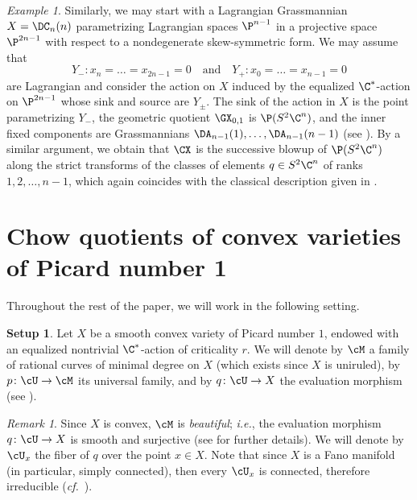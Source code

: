 \documentclass[11pt]{amsart}
\numberwithin{equation}{section}
\theoremstyle{definition}
\newtheorem{setup}[theorem]{Setup}
\theoremstyle{remark}
\newtheorem{remark}[theorem]{Remark}
\newtheorem{example}[theorem]{Example}
\begin{document}
\begin{example}\label{ex:classicex3}
  Similarly, we may start with a Lagrangian Grassmannian $X=\DC_n(n)$ parametrizing Lagrangian spaces $\P^{n-1}$ in a projective space $\P^{2n-1}$ with respect to a nondegenerate skew-symmetric form. We may assume that
  \[
  Y_-:x_n=\dots=x_{2n-1}=0\quad\mbox{and}\quad Y_+:x_0=\dots=x_{n-1}=0 
  \]
  are Lagrangian and consider the action on $X$ induced by the equalized $\C^*$-action on $\P^{2n-1}$ whose sink and source are $Y_\pm$. The sink of the action in $X$ is the point parametrizing $Y_-$, the geometric quotient $\GX_{0,1}$ is $\P(S^2\C^n)$, and the inner fixed components are Grassmannians $\DA_{n-1}(1),\dots,\DA_{n-1}(n-1)$ (see \cite{FS}). By a similar argument, we obtain that $\CX$ is the successive blowup of $\P(S^2\C^n)$ along the strict transforms of the classes of elements $q\in S^2\C^n$ of ranks $1,2,\dots, n-1$, which again coincides with the classical description given in \cite{Vai82}. 
\end{example}


\section{Chow quotients of convex varieties of Picard number 1}\label{sec:boundaryprimal}

Throughout the rest of the paper, we will work in the following setting. 

\begin{setup}\label{set:main}
Let $X$ be a smooth convex variety of Picard number $1$, endowed with an equalized nontrivial $\C^*$-action of criticality $r$. 
We will denote by  $\cM$ a family of rational curves of minimal degree on $X$ (which exists since $X$ is uniruled), by $p\colon\cU \to \cM$ its universal family, and by $q\colon \cU \to X$ the evaluation morphism (see \cite[Proposition~II.2.11]{kollar}).
\end{setup}

\begin{remark}\label{rem:convexcurves}
Since $X$ is convex, $\cM$ is {\em beautiful}; \textit{i.e.}, the evaluation morphism $q\colon \cU \to X$ is smooth and surjective (see \cite[Section 2.7]{OS2} for further details). We will denote by $\cU_x$ the fiber of $q$ over the point $x \in X$. Note that since $X$ is a Fano manifold (in particular, simply connected), then  every $\cU_x$ is connected, therefore irreducible (\textit{cf.}~\cite[Proposition~1.6]{Kan5}). 
\end{remark}
\end{document}
